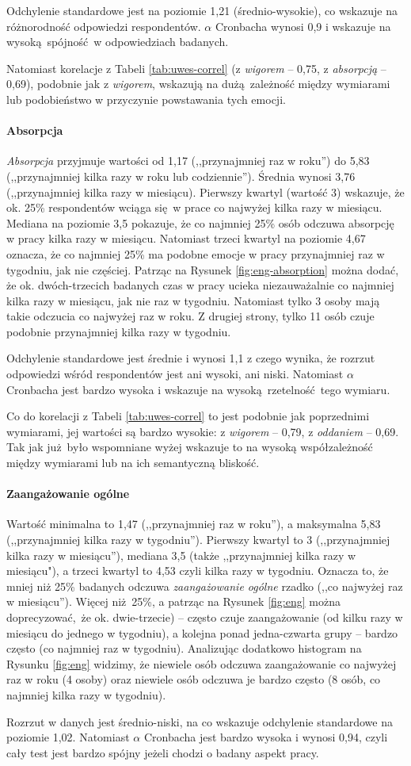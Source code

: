Odchylenie standardowe jest na poziomie 1,21 (średnio-wysokie), co wskazuje na różnorodność odpowiedzi respondentów. $\alpha$ Cronbacha wynosi 0,9 i wskazuje na wysoką spójność w odpowiedziach badanych.

Natomiast korelacje z Tabeli \ref{tab:uwes-correl} (z \textit{wigorem} -- 0,75, z \textit{absorpcją} -- 0,69), podobnie jak z \textit{wigorem}, wskazują na dużą zależność między wymiarami lub podobieństwo w przyczynie powstawania tych emocji.

\paragraph{Absorpcja} \textit{Absorpcja} przyjmuje wartości od 1,17 (,,przynajmniej raz w roku'') do 5,83 (,,przynajmniej kilka razy w roku lub codziennie''). Średnia wynosi 3,76 (,,przynajmniej kilka razy w miesiącu). Pierwszy kwartyl (wartość 3) wskazuje, że ok. 25\% respondentów wciąga się w prace co najwyżej kilka razy w miesiącu. Mediana na poziomie 3,5 pokazuje, że co najmniej 25\% osób odczuwa absorpcję w pracy kilka razy w miesiącu. Natomiast trzeci kwartyl na poziomie
4,67 oznacza, że co najmniej 25\% ma podobne emocje w pracy przynajmniej raz w tygodniu, jak nie częściej. Patrząc na Rysunek \ref{fig:eng-absorption} można dodać, że ok. dwóch-trzecich badanych czas w pracy ucieka niezauważalnie co najmniej kilka razy w miesiącu, jak nie raz w tygodniu. Natomiast tylko 3 osoby mają takie odczucia co najwyżej raz w roku. Z drugiej strony, tylko 11 osób czuje podobnie przynajmniej kilka razy w tygodniu.

Odchylenie standardowe jest średnie i wynosi 1,1 z czego wynika, że rozrzut odpowiedzi wśród respondentów jest ani wysoki, ani niski. Natomiast $\alpha$ Cronbacha jest bardzo wysoka i wskazuje na wysoką rzetelność tego wymiaru.

Co do korelacji z Tabeli \ref{tab:uwes-correl} to jest podobnie jak poprzednimi wymiarami, jej wartości są bardzo wysokie: z \textit{wigorem} -- 0,79, z \textit{oddaniem} -- 0,69. Tak jak już było wspomniane wyżej wskazuje to na wysoką współzależność między wymiarami lub na ich semantyczną bliskość.  

\paragraph{Zaangażowanie ogólne} Wartość minimalna to 1,47 (,,przynajmniej raz w roku''), a maksymalna 5,83 (,,przynajmniej kilka razy w tygodniu''). Pierwszy kwartyl to 3 (,,przynajmniej kilka razy w miesiącu''), mediana 3,5 (także ,,przynajmniej kilka razy w miesiącu"), a trzeci kwartyl to 4,53 czyli kilka razy w tygodniu. Oznacza to, że mniej niż 25\% badanych odczuwa \textit{zaangażowanie ogólne} rzadko (,,co najwyżej raz w miesiącu''). Więcej niż 25\%, a patrząc na Rysunek \ref{fig:eng} można
doprecyzować, że ok. dwie-trzecie) -- często czuje zaangażowanie
(od kilku razy w miesiącu do jednego w tygodniu), a kolejna ponad jedna-czwarta grupy -- bardzo często (co najmniej raz w tygodniu). Analizując dodatkowo histogram na Rysunku \ref{fig:eng} widzimy, że niewiele osób odczuwa zaangażowanie co najwyżej raz w roku (4 osoby) oraz niewiele osób odczuwa je bardzo często (8 osób, co najmniej kilka razy w tygodniu).

Rozrzut w danych jest średnio-niski, na co wskazuje odchylenie standardowe na poziomie 1,02. Natomiast $\alpha$ Cronbacha jest bardzo wysoka i wynosi 0,94, czyli cały test jest bardzo spójny jeżeli chodzi o badany aspekt pracy.

